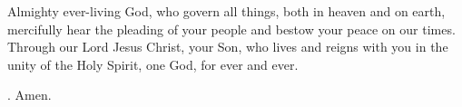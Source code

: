 \lettrine[lines=3]{A}{}lmighty ever-living God,
who govern all things,
both in heaven and on earth,
mercifully hear the pleading of your people
and bestow your peace on our times.
Through our Lord Jesus Christ, your Son,
who lives and reigns with you in the unity of the Holy Spirit,
one God, for ever and ever. \par \Rbar. Amen.
